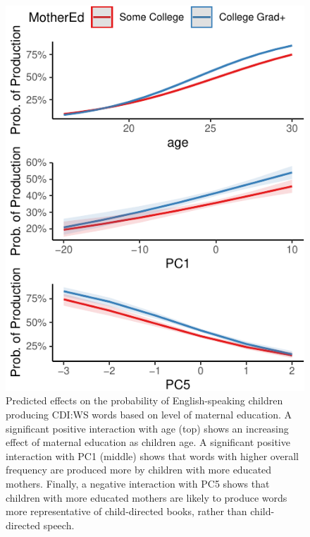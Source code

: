 \documentclass[10pt, letterpaper]{article}
\newenvironment{CodeChunk}{}{}
\begin{document}
\begin{CodeChunk}
\begin{figure}[t]

{\centering \includegraphics{figs/unnamed-chunk-12-1} 

}

\caption[Predicted effects on the probability of English-speaking children producing CDI:WS words based on level of maternal education]{Predicted effects on the probability of English-speaking children producing CDI:WS words based on level of maternal education. A significant positive interaction with age (top) shows an increasing effect of maternal education as children age. A significant positive interaction with PC1 (middle) shows that words with higher overall frequency are produced more by children with more educated mothers. Finally, a negative interaction with PC5 shows that children with more educated mothers are likely to produce words more representative of child-directed books, rather than child-directed speech.}\label{fig:unnamed-chunk-12}
\end{figure}
\end{CodeChunk}
\end{document}
